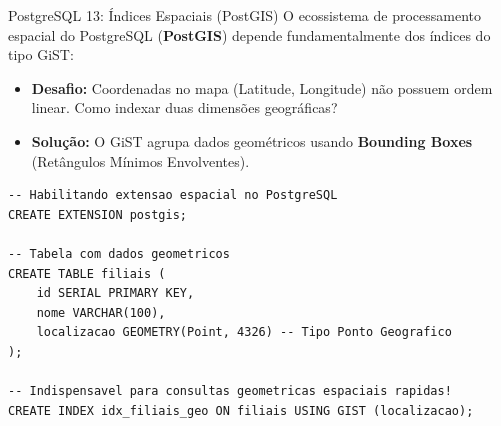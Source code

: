 \documentclass[9pt]{beamer}
\begin{document}
\begin{frame}[fragile]{PostgreSQL 13: Índices Espaciais (PostGIS)}
    O ecossistema de processamento espacial do PostgreSQL (\textbf{PostGIS}) depende fundamentalmente dos índices do tipo GiST:
    
    \vspace{0.2cm}
    \begin{itemize}
        \item \textbf{Desafio:} Coordenadas no mapa (Latitude, Longitude) não possuem ordem linear. Como indexar duas dimensões geográficas?
        \item \textbf{Solução:} O GiST agrupa dados geométricos usando \textbf{Bounding Boxes} (Retângulos Mínimos Envolventes).
    \end{itemize}
    
    \vspace{0.2cm}
    \begin{lstlisting}[basicstyle=\ttfamily\scriptsize]
-- Habilitando extensao espacial no PostgreSQL
CREATE EXTENSION postgis;

-- Tabela com dados geometricos
CREATE TABLE filiais (
    id SERIAL PRIMARY KEY,
    nome VARCHAR(100),
    localizacao GEOMETRY(Point, 4326) -- Tipo Ponto Geografico
);

-- Indispensavel para consultas geometricas espaciais rapidas!
CREATE INDEX idx_filiais_geo ON filiais USING GIST (localizacao);
    \end{lstlisting}
\end{frame}
\end{document}
